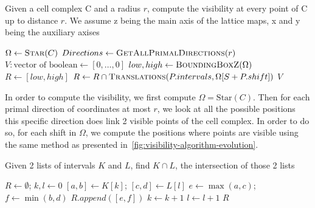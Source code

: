 \documentclass[runningheads]{llncs}
\begin{document}
    \begin{algorithm}
        \caption{Given a cell complex C and a radius $r$, compute the visibility at every point of C up to distance $r$. We assume z being the main axis of the lattice maps, x and y being the auxiliary axises}
        \label{alg:visibility}
        \begin{algorithmic}
                \State $\Omega \gets \Call{Star}{C}$ 
                \State $Directions \gets \Call{GetAllPrimalDirections}{r}$
                \State $V: \text{vector of boolean} \gets [0, \ldots, 0]$ 
                \State $low, high \gets \Call{BoundingBoxZ}{\Omega}$
                        \State $R \gets [low, high]$
                            \State $R \gets R \cap \Call{Translations}{P.intervals,\Omega[S + P.shift]}$
                        \EndFor
                        \State {}
                    \EndFor
                \EndFor
                \State \Return $V$
            \EndFunction
        \end{algorithmic}
    \end{algorithm}

    In order to compute the visibility, we first compute $\Omega = \text{Star}(C)$. Then for each primal direction of
    coordinates at most $r$, we look at all the possible positions this specific direction does link 2 visible points
    of the cell complex. In order to do so, for each shift in $\Omega$, we compute the positions where points are
    visible using the same method as presented in~\ref{fig:visibility-algorithm-evolution}.

    \begin{algorithm}
        \caption{Given 2 lists of intervals $K$ and $L$, find $K \cap L$, the intersection of those 2 lists}
        \label{alg:intersection}
        \begin{algorithmic}
                \State $R \gets \emptyset$; $k, l \gets 0$
                    \State $[a,b] \gets K[k]$; $[c,d] \gets L[l]$
                    \State $e \gets \max(a, c)$; $f \gets \min(b, d)$
                        \State $R.append([e, f])$
                    \EndIf
                        \State $k \gets k+1$
                    \EndIf
                        \State $l \gets l+1$
                    \EndIf
                \EndWhile
                \State \Return $R$
            \EndFunction
        \end{algorithmic}
    \end{algorithm}
\end{document}
